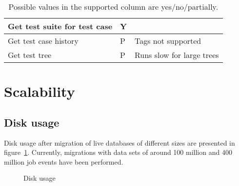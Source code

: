 \begin{table}[h]
\begin{tabular}{|l|l|l|}
Get test suite for test case                 & Y                                                                                        &                            \\ \hline
Get test case history                        & P                                                                                        & Tags not supported         \\ \hline
Get test tree                                & P                                                                                        & Runs slow for large trees  \\ \hline
\end{tabular}
\caption{Possible values in the supported column are yes/no/partially.}
\label{tab:archivequeries}
\end{table}


\section{Scalability}
\subsection{Disk usage}
Disk usage after migration of live databases of different sizes are presented in figure~\ref{fig:disc}. Currently, migrations with data sets of around 100 million and 400 million job events have been performed. 
\begin{figure}[h!]
\centering
{}
\caption{Disk usage}
\label{fig:disc}
\end{figure}

